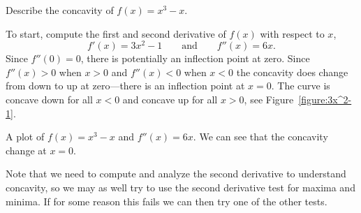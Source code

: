 \begin{example}
Describe the concavity of $f(x)=x^3-x$. 
\end{example}

\begin{solution}
To start, compute the first and second derivative of $f(x)$ with
respect to $x$,
\[
f'(x)=3x^2-1\qquad\text{and}\qquad f''(x)=6x.
\]
Since $f''(0)=0$, there is potentially an inflection point at
zero. Since $f''(x)>0$ when $x>0$ and $f''(x)<0$ when $x<0$ the
concavity does change from down to up at zero---there is an inflection
point at $x=0$. The curve is concave down for all $x<0$ and
concave up for all $x>0$, see Figure~\ref{figure:3x^2-1}.
\end{solution}
\begin{marginfigure}[0in]
\caption{A plot of $f(x) = x^3-x$ and $f''(x) = 6x$. We can see that
  the concavity change at $x=0$.}
\label{figure:3x^2-1}
\end{marginfigure}

Note that we need to compute and analyze the second derivative to
understand concavity, so we may as well try to use the second
derivative test for maxima and minima. If for some reason this fails
we can then try one of the other tests.


